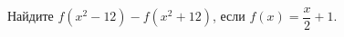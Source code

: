 \begin{ex}
	\begin{condition}
		Найдите \( f(x^2-12)-f(x^2+12) \), если \( f(x)=\dfrac{x}{2}+1 \).
	\end{condition}
\end{ex}
